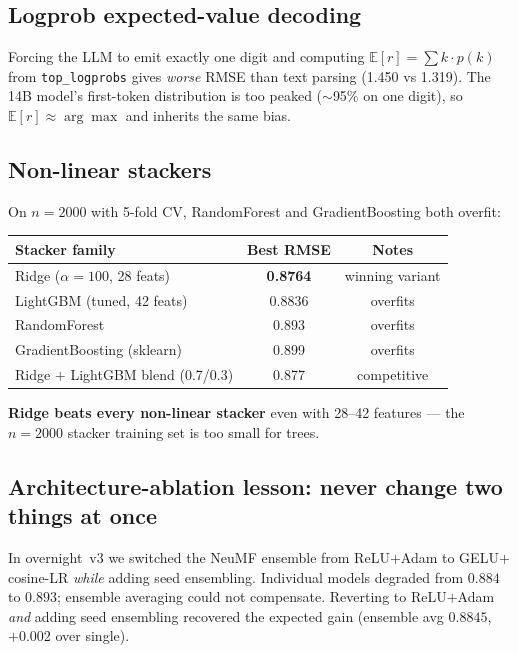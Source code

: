 \documentclass[11pt,a4paper]{article}
\newcommand{\best}[1]{\textcolor{goodgreen}{\textbf{#1}}}
\begin{document}
\subsection{Logprob expected-value decoding}
Forcing the LLM to emit exactly one digit and computing
$\mathbb{E}[r] = \sum k\cdot p(k)$ from \texttt{top\_logprobs} gives
\emph{worse} RMSE than text parsing (1.450 vs 1.319). The 14B model's
first-token distribution is too peaked ($\sim$95\% on one digit), so
$\mathbb{E}[r] \approx \arg\max$ and inherits the same bias.

\subsection{Non-linear stackers}
On $n=2000$ with 5-fold CV, RandomForest and GradientBoosting both overfit:
\begin{center}
\begin{tabular}{lcc}
\toprule
Stacker family & Best RMSE & Notes \\ \midrule
Ridge ($\alpha{=}100$, 28 feats)         & \best{0.8764} & winning variant \\
LightGBM (tuned, 42 feats)               & 0.8836        & overfits \\
RandomForest                              & 0.893         & overfits \\
GradientBoosting (sklearn)               & 0.899         & overfits \\
Ridge $+$ LightGBM blend (0.7/0.3)       & 0.877         & competitive \\
\bottomrule
\end{tabular}
\end{center}
\textbf{Ridge beats every non-linear stacker} even with 28--42 features
--- the $n=2000$ stacker training set is too small for trees.

\subsection{Architecture-ablation lesson: never change two things at once}
In overnight~v3 we switched the NeuMF ensemble from ReLU$+$Adam to
GELU$+$cosine-LR \emph{while} adding seed ensembling. Individual models
degraded from $0.884$ to $0.893$; ensemble averaging could not
compensate. Reverting to ReLU$+$Adam \emph{and} adding seed ensembling
recovered the expected gain (ensemble avg $0.8845$, $+0.002$ over single).
\end{document}

